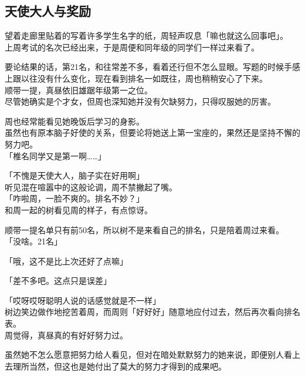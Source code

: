 \subsection{天使大人与奖励}

望着走廊里贴着的写着许多学生名字的纸，周轻声叹息「嘛也就这么回事吧」。\\

上周考试的名次已经出来，于是周便和同年级的同学们一样过来看了。

要论结果的话，第21名，和往常差不多，看着还行但不怎么显眼。写题的时候手感上跟以往没有什么变化，现在看到排名一如既往，周也稍稍安心了下来。\\

顺带一提，真昼依旧雄踞年级第一之位。\\

尽管她确实是个才女，但周也深知她并没有欠缺努力，只得叹服她的厉害。

周也经常能看见她晚饭后学习的身影。\\

虽然也有原本脑子好使的关系，但要论将她送上第一宝座的，果然还是坚持不懈的努力吧。\\

「椎名同学又是第一啊……」

「不愧是天使大人，脑子实在好用啊」\\

听见混在喧嚣中的这般论调，周不禁撇起了嘴。\\

「咋啦周，一脸不爽的。排名不妙？」\\

和周一起的树看见周的样子，有点惊讶。

顺带一提名单只有前50名，所以树不是来看自己的排名，只是陪着周过来看。\\

「没啥。21名」

「哦，这不是比上次还好了点嘛」

「差不多吧。这点只是误差」

「哎呀哎呀聪明人说的话感觉就是不一样」\\

树边笑边做作地挖苦着周，而周则「好好好」随意地应付过去，然后再次看向排名表。\\

周觉得，真昼真的有好好努力过。

虽然她不怎么愿意把努力给人看见，但对在暗处默默努力的她来说，即便别人看上去理所当然，但这也是她付出了莫大的努力才得到的成果吧。\\

